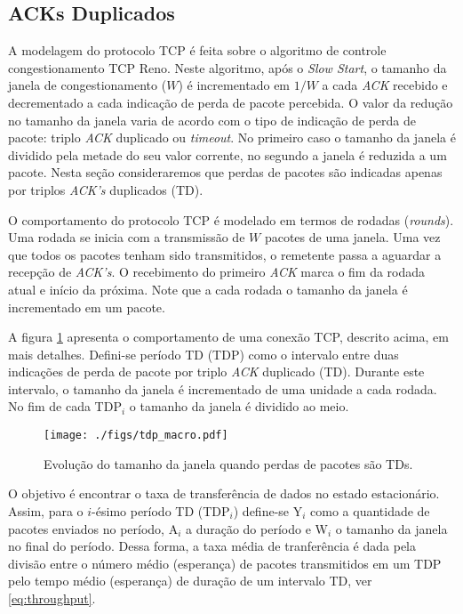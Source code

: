 
\subsection{ACKs Duplicados}
A modelagem do protocolo TCP é feita sobre o algoritmo de controle congestionamento TCP Reno.
Neste algoritmo, após o \textit{Slow Start}, o tamanho da janela de congestionamento ($W$) é 
incrementado em $1/W$ a cada \textit{ACK} recebido e decrementado a cada indicação de perda 
de pacote percebida. O valor da redução no tamanho da janela varia de acordo com o tipo de indicação de
perda de pacote: triplo \textit{ACK} duplicado ou \textit{timeout}. No primeiro caso o tamanho
da janela é dividido pela metade do seu valor corrente, no segundo a janela é reduzida a um 
pacote. Nesta seção consideraremos que perdas de pacotes são indicadas apenas por triplos 
\textit{ACK's} duplicados (TD).

O comportamento do protocolo TCP é modelado em termos de rodadas (\textit{rounds}). Uma rodada
se inicia com a transmissão de $W$ pacotes de uma janela. Uma vez que todos os pacotes tenham sido 
transmitidos, o remetente passa a aguardar a recepção de \textit{ACK's}. O recebimento do primeiro 
\textit{ACK} marca o fim da rodada atual e início da próxima. Note que a cada rodada o tamanho da 
janela é incrementado em um pacote.

A figura \ref{fig:tdp_macro} apresenta o comportamento de uma conexão TCP, descrito acima, em mais detalhes. 
Defini-se período TD (TDP) como o intervalo entre duas indicações de perda de pacote por triplo \textit{ACK} 
duplicado (TD). Durante este intervalo, o tamanho da janela é incrementado de uma unidade a cada rodada. 
No fim de cada TDP$_{i}$ o tamanho da janela é dividido ao meio.

\begin{figure}[ht]
  \centering
  \texttt{[image: ./figs/tdp\_macro.pdf]}
  \caption{Evolução do tamanho da janela quando perdas de pacotes são TDs.}
  \label{fig:tdp_macro}
\end{figure}

O objetivo é encontrar o taxa de transferência de dados no estado estacionário. Assim, para o $i$-ésimo 
período TD (TDP$_{i}$) define-se Y$_i$ como a quantidade de pacotes enviados no período, A$_i$ a duração 
do período e W$_i$ o tamanho da janela no final do período. Dessa forma, a taxa média de tranferência é
dada pela divisão entre o número médio (esperança) de pacotes transmitidos em um TDP pelo tempo médio 
(esperança) de duração de um intervalo TD, ver \eqref{eq:throughput}.

